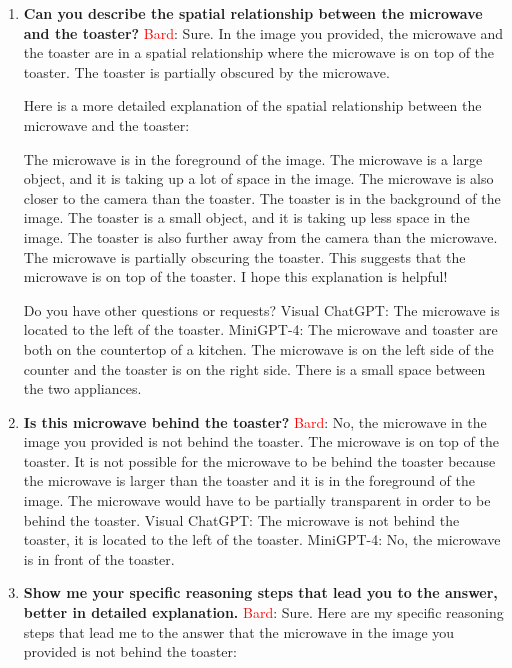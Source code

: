 \begin{enumerate}
    \item \textbf{Can you describe the spatial relationship between the microwave and the toaster?}
    \subitem \textcolor{Red}{Bard}: Sure. In the image you provided, the microwave and the toaster are in a spatial relationship where the microwave is on top of the toaster. The toaster is partially obscured by the microwave.

    Here is a more detailed explanation of the spatial relationship between the microwave and the toaster:
    
    The microwave is in the foreground of the image. The microwave is a large object, and it is taking up a lot of space in the image. The microwave is also closer to the camera than the toaster.
    The toaster is in the background of the image. The toaster is a small object, and it is taking up less space in the image. The toaster is also further away from the camera than the microwave.
    The microwave is partially obscuring the toaster. This suggests that the microwave is on top of the toaster.
    I hope this explanation is helpful!
    
    Do you have other questions or requests?
    \subitem Visual ChatGPT: The microwave is located to the left of the toaster.
    \subitem MiniGPT-4: The microwave and toaster are both on the countertop of a kitchen. The microwave is on the left side of the counter and the toaster is on the right side. There is a small space between the two appliances.
    \item \textbf{Is this microwave behind the toaster?}
    \subitem \textcolor{Red}{Bard}: 
    No, the microwave in the image you provided is not behind the toaster. The microwave is on top of the toaster. It is not possible for the microwave to be behind the toaster because the microwave is larger than the toaster and it is in the foreground of the image. The microwave would have to be partially transparent in order to be behind the toaster.
    \subitem Visual ChatGPT: The microwave is not behind the toaster, it is located to the left of the toaster.
    \subitem MiniGPT-4: No, the microwave is in front of the toaster.
    \item \textbf{Show me your specific reasoning steps that lead you to the answer, better in detailed explanation.}
    \subitem \textcolor{Red}{Bard}: 
    Sure. Here are my specific reasoning steps that lead me to the answer that the microwave in the image you provided is not behind the toaster:


\end{enumerate}
